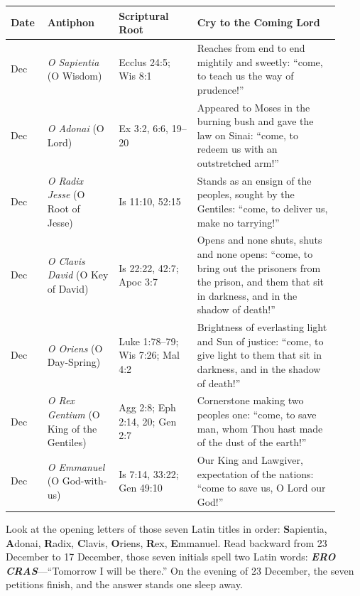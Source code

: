 {\footnotesize
\begin{longtable}{>{\raggedright\arraybackslash}p{0.10\linewidth}>{\raggedright\arraybackslash}p{0.20\linewidth}>{\raggedright\arraybackslash}p{0.22\linewidth}>{\raggedright\arraybackslash}p{0.40\linewidth}}
\toprule
\textbf{Date} & \textbf{Antiphon} & \textbf{Scriptural Root} & \textbf{Cry to the Coming Lord}\\
\midrule
\endhead
17 Dec & \textit{O Sapientia} (O Wisdom) & Ecclus 24:5; Wis 8:1 & Reaches from end to end mightily and sweetly: ``come, to teach us the way of prudence!''\\
18 Dec & \textit{O Adonai} (O Lord) & Ex 3:2, 6:6, 19--20 & Appeared to Moses in the burning bush and gave the law on Sinai: ``come, to redeem us with an outstretched arm!''\\
19 Dec & \textit{O Radix Jesse} (O Root of Jesse) & Is 11:10, 52:15 & Stands as an ensign of the peoples, sought by the Gentiles: ``come, to deliver us, make no tarrying!''\\
20 Dec & \textit{O Clavis David} (O Key of David) & Is 22:22, 42:7; Apoc 3:7 & Opens and none shuts, shuts and none opens: ``come, to bring out the prisoners from the prison, and them that sit in darkness, and in the shadow of death!''\\
21 Dec & \textit{O Oriens} (O Day-Spring) & Luke 1:78--79; Wis 7:26; Mal 4:2 & Brightness of everlasting light and Sun of justice: ``come, to give light to them that sit in darkness, and in the shadow of death!''\\
22 Dec & \textit{O Rex Gentium} (O King of the Gentiles) & Agg 2:8; Eph 2:14, 20; Gen 2:7 & Cornerstone making two peoples one: ``come, to save man, whom Thou hast made of the dust of the earth!''\\
23 Dec & \textit{O Emmanuel} (O God-with-us) & Is 7:14, 33:22; Gen 49:10 & Our King and Lawgiver, expectation of the nations: ``come to save us, O Lord our God!''\\
\bottomrule
\end{longtable}
}

Look at the opening letters of those seven Latin titles in order:
\textbf{S}apientia, \textbf{A}donai, \textbf{R}adix, \textbf{C}lavis,
\textbf{O}riens, \textbf{R}ex, \textbf{E}mmanuel. Read backward from 23
December to 17 December, those seven initials spell two Latin words:
\textbf{\textit{ERO CRAS}}---``Tomorrow I will be there.'' On the evening of 23
December, the seven petitions finish, and the answer stands one sleep away.

